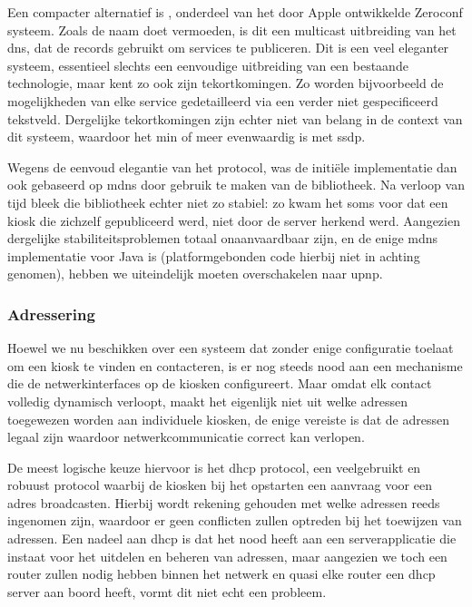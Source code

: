 Een compacter alternatief is , onderdeel van het door Apple ontwikkelde Zeroconf systeem. Zoals de naam doet vermoeden, is dit een multicast uitbreiding van het \ac{dns}, dat de  records gebruikt om services te publiceren. Dit is een veel eleganter systeem, essentieel slechts een eenvoudige uitbreiding van een bestaande technologie, maar kent zo ook zijn tekortkomingen. Zo worden bijvoorbeeld de mogelijkheden van elke service gedetailleerd via een verder niet gespecificeerd tekstveld. Dergelijke tekortkomingen zijn echter niet van belang in de context van dit systeem, waardoor het min of meer evenwaardig is met \ac{ssdp}.

Wegens de eenvoud elegantie van het protocol, was de initiële implementatie dan ook gebaseerd op \ac{mdns} door gebruik te maken van de  bibliotheek. Na verloop van tijd bleek die bibliotheek echter niet zo stabiel: zo kwam het soms voor dat een kiosk die zichzelf gepubliceerd werd, niet door de server herkend werd. Aangezien dergelijke stabiliteitsproblemen totaal onaanvaardbaar zijn, en  de enige \ac{mdns} implementatie voor Java is (platformgebonden code hierbij niet in achting genomen), hebben we uiteindelijk moeten overschakelen naar \ac{upnp}.

\subsubsection{Adressering}

Hoewel we nu beschikken over een systeem dat zonder enige configuratie toelaat om een kiosk te vinden en contacteren, is er nog steeds nood aan een mechanisme die de netwerkinterfaces op de kiosken configureert. Maar omdat elk contact volledig dynamisch verloopt, maakt het eigenlijk niet uit welke adressen toegewezen worden aan individuele kiosken, de enige vereiste is dat de adressen legaal zijn waardoor netwerkcommunicatie correct kan verlopen.

De meest logische keuze hiervoor is het \ac{dhcp} protocol, een veelgebruikt en robuust protocol waarbij de kiosken bij het opstarten een aanvraag voor een adres broadcasten. Hierbij wordt rekening gehouden met welke adressen reeds ingenomen zijn, waardoor er geen conflicten zullen optreden bij het toewijzen van adressen. Een nadeel aan \ac{dhcp} is dat het nood heeft aan een serverapplicatie die instaat voor het uitdelen en beheren van adressen, maar aangezien we toch een router zullen nodig hebben binnen het netwerk en quasi elke router een \ac{dhcp} server aan boord heeft, vormt dit niet echt een probleem.

